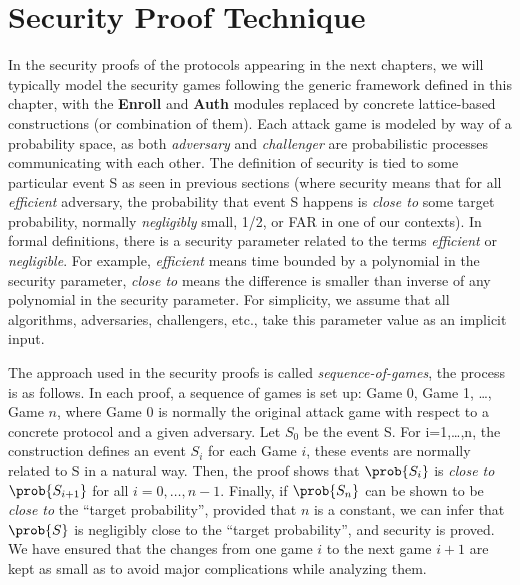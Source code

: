 \section{Security Proof Technique}
In the security proofs of the protocols appearing in the next chapters, we will typically
model the security games following the generic framework defined in this
chapter, with the \textbf{Enroll} and \textbf{Auth} modules replaced by concrete
lattice-based constructions (or combination of them). Each attack game is
modeled by way of a probability space, as both \textit{adversary} and
\textit{challenger} are probabilistic processes communicating with each other. The
definition of security is tied to some particular event S as seen in previous
sections (where security means that for all \textit{efficient} adversary, the
probability that event S happens is \textit{close to} some target probability,
normally \textit{negligibly} small, 1/2, or FAR in one of our contexts). In
formal definitions, there is a security parameter related to the terms
\textit{efficient} or \textit{negligible}. For example, \textit{efficient} means
time bounded by a polynomial in the security parameter, \textit{close to} means
the difference is smaller than inverse of any polynomial in the security
parameter. For simplicity, we assume that all algorithms, adversaries,
challengers, etc., take this parameter value as an implicit input.

The approach used in the security proofs is called \textit{sequence-of-games},
the process is as follows. In each proof,  a sequence of games is set up:
Game 0, Game 1, \dots, Game $n$, where Game 0 is normally the original attack
game with respect to a concrete protocol and a given adversary. Let $S_{0}$ be
the event S. For i=1,\dots,n, the construction defines an event $S_{i}$ for each
Game $i$, these events are normally related to S in a natural way. Then, the
proof shows that $\prob{S_{i}}$ is \textit{close to} $\prob{S_{i+1}}$ for all
$i=0,\dots,n-1$. Finally, if $\prob{S_{n}}$ can be shown to be \textit{close to}
the ``target probability'', provided that $n$ is a constant, we can infer that
$\prob{S}$ is negligibly close to the ``target probability'', and security is
proved. We have ensured that the changes from one game $i$ to the next game
$i+1$ are kept as small as to avoid major complications while analyzing them.

